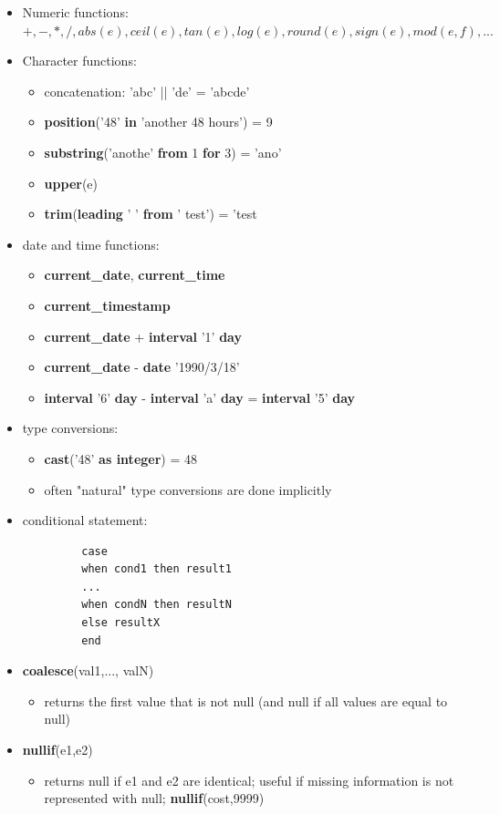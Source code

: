 \begin{itemize}[label=\(\rhd\)]
    \item Numeric functions: $+,-,*,/, abs(e), ceil(e), tan(e), log(e), round(e), sign(e), mod(e,f),...$
    \item Character functions:
    \begin{itemize}[label=\(\rhd\)]
        \item concatenation: 'abc' || 'de' = 'abcde'
        \item \textbf{position}('48' \textbf{in} 'another 48 hours') = 9
        \item \textbf{substring}('anothe' \textbf{from} 1 \textbf{for} 3) = 'ano'
        \item \textbf{upper}(e)
        \item \textbf{trim}(\textbf{leading} ' ' \textbf{from} ' test') = 'test
    \end{itemize}
    \item date and time functions:
    \begin{itemize}[label=\(\rhd\)]
        \item \textbf{current\_date}, \textbf{current\_time}
        \item \textbf{current\_timestamp}
        \item \textbf{current\_date} + \textbf{interval} '1' \textbf{day}
        \item \textbf{current\_date} - \textbf{date} '1990/3/18'
        \item \textbf{interval} '6' \textbf{day} - \textbf{interval} 'a' \textbf{day} = \textbf{interval} '5' \textbf{day}
     \end{itemize}
     \item type conversions:
     \begin{itemize}[label=\(\rhd\)]
         \item \textbf{cast}('48' \textbf{as integer}) = 48
         \item often "natural" type conversions are done implicitly
     \end{itemize}
     \item conditional statement:
     \begin{lstlisting}
         case
         when cond1 then result1
         ...
         when condN then resultN
         else resultX
         end
     \end{lstlisting}
     \item \textbf{coalesce}(val1,..., valN)
     \begin{itemize}[label=\(\rhd\)]
         \item returns the first value that is not null (and null if all values are equal to null)
     \end{itemize}
     \item  \textbf{nullif}(e1,e2)
     \begin{itemize}[label=\(\rhd\)]
         \item returns null if e1 and e2 are identical; useful if missing information is not represented with null; \textbf{nullif}(cost,9999)
     \end{itemize}
\end{itemize}

